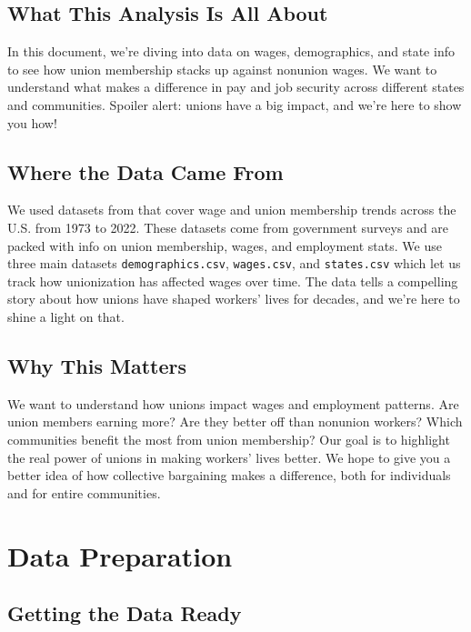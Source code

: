 \documentclass[
]{book}
\theoremstyle{definition}
\theoremstyle{definition}
\theoremstyle{definition}
\theoremstyle{definition}
\theoremstyle{remark}
\begin{document}
\subsection{What This Analysis Is All About}\label{what-this-analysis-is-all-about}

In this document, we're diving into data on wages, demographics, and state info to see how union membership stacks up against nonunion wages. We want to understand what makes a difference in pay and job security across different states and communities. Spoiler alert: unions have a big impact, and we're here to show you how!

\subsection{Where the Data Came From}\label{where-the-data-came-from}

We used datasets from \citet{tidytuesday} that cover wage and union membership trends across the U.S. from 1973 to 2022. These datasets come from government surveys and are packed with info on union membership, wages, and employment stats. We use three main datasets \texttt{demographics.csv}, \texttt{wages.csv}, and \texttt{states.csv} which let us track how unionization has affected wages over time. The data tells a compelling story about how unions have shaped workers' lives for decades, and we're here to shine a light on that.

\subsection{Why This Matters}\label{why-this-matters}

We want to understand how unions impact wages and employment patterns. Are union members earning more? Are they better off than nonunion workers? Which communities benefit the most from union membership? Our goal is to highlight the real power of unions in making workers' lives better. We hope to give you a better idea of how collective bargaining makes a difference, both for individuals and for entire communities.

\section{Data Preparation}\label{data-preparation}

\subsection{Getting the Data Ready}\label{getting-the-data-ready}
\end{document}
